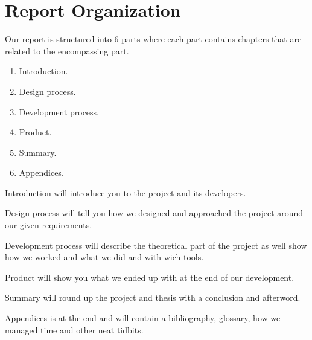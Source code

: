 \section{Report Organization}


Our report is structured into 6 parts where each part contains chapters that are related to the encompassing part.

\begin{enumerate}
	\item Introduction.
	\item Design process.
	\item Development process.
	\item Product.
	\item Summary.
	\item Appendices.
\end{enumerate}

Introduction will introduce you to the project and its developers.


Design process will tell you how we designed and approached the project around our given requirements.


Development process will describe the theoretical part of the project as well show how we worked and what we did and with wich tools.


Product will show you what we ended up with at the end of our development.


Summary will round up the project and thesis with a conclusion and afterword.


Appendices is at the end and will contain a bibliography, glossary, how we managed time and other neat tidbits.



